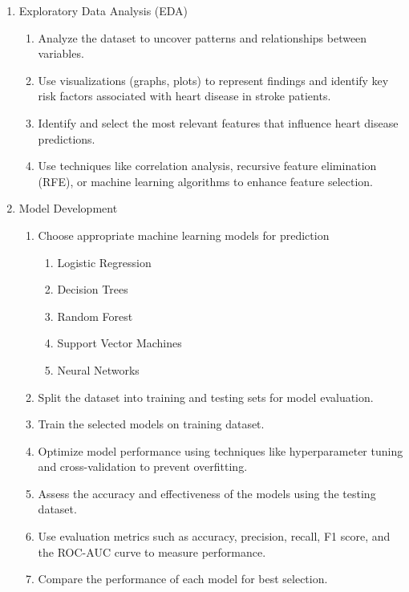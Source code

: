 \documentclass[runningheads]{llncs}
\begin{document}
\begin{enumerate}
\item  Exploratory Data Analysis (EDA)
    \begin{enumerate}
        \item Analyze the dataset to uncover patterns and relationships between variables. 
        \item Use visualizations (graphs, plots) to represent findings and identify key risk factors associated with heart disease in stroke patients. 
        \item Identify and select the most relevant features that influence heart disease predictions. 
        \item Use techniques like correlation analysis, recursive feature elimination (RFE), or machine learning algorithms to enhance feature selection. 
    \end{enumerate}
    
\item Model Development
    \begin{enumerate}
        \item Choose appropriate machine learning models for prediction 
            \begin{enumerate}
                \item Logistic Regression
                \item Decision Trees 
                \item Random Forest 
                \item Support Vector Machines 
                \item Neural Networks 
            \end{enumerate}
        \item Split the dataset into training and testing sets for model evaluation. 
        \item Train the selected models on training dataset. 
        \item Optimize model performance using techniques like hyperparameter tuning and cross-validation to prevent overfitting. 
        \item Assess the accuracy and effectiveness of the models using the testing dataset. 
        \item Use evaluation metrics such as accuracy, precision, recall, F1 score, and the ROC-AUC curve to measure performance. 
        \item Compare the performance of each model for best selection.
\end{enumerate}


\end{enumerate}
\end{document}
